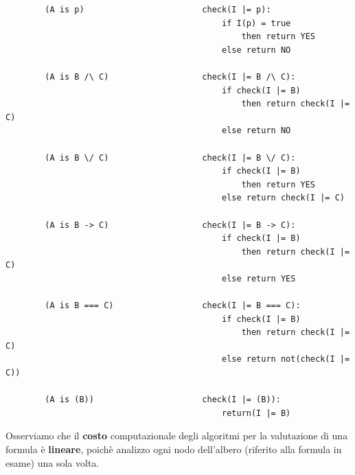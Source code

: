    \begin{verbatim}
        (A is p)                        check(I |= p):
                                            if I(p) = true
                                                then return YES
                                            else return NO

        (A is B /\ C)                   check(I |= B /\ C):
                                            if check(I |= B)
                                                then return check(I |= C)
                                            else return NO

        (A is B \/ C)                   check(I |= B \/ C):
                                            if check(I |= B)
                                                then return YES
                                            else return check(I |= C)

        (A is B -> C)                   check(I |= B -> C):
                                            if check(I |= B)
                                                then return check(I |= C)
                                            else return YES

        (A is B === C)                  check(I |= B === C):
                                            if check(I |= B)
                                                then return check(I |= C)
                                            else return not(check(I |= C))

        (A is (B))                      check(I |= (B)):
                                            return(I |= B)
\end{verbatim}
Osserviamo che il \textbf{costo} computazionale degli algoritmi per la valutazione di una formula  è \textbf{lineare}, poichè analizzo ogni nodo
dell'albero (riferito alla formula in esame) una sola volta.


